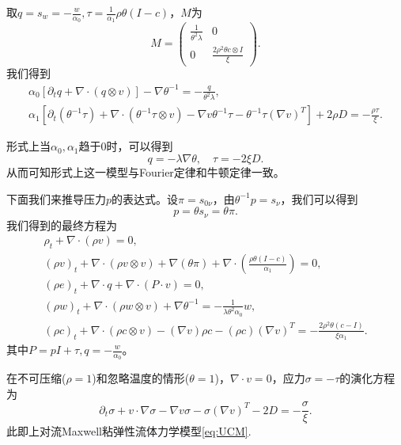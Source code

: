 	取$q=s_w=-\frac{ w}{\alpha_0},\tau = \frac{1}{\alpha_1} \rho \theta (I-c)$，$M$为
	\begin{equation*}
		M = \left( \begin{array}{ccc} 
			\frac{1}{\theta^2 \lambda} & 0 \\
			0 &  \frac{2 \rho^2 \theta c \otimes I}{\xi}   
		\end{array} \right).
	\end{equation*}
	我们得到
	\begin{eqnarray*}
		\alpha_0 [\partial_t q +  \nabla \cdot (q \otimes v)] - \nabla \theta^{-1} = -\frac{q}{\theta^2 \lambda}, \\
		\alpha_1[\partial_t (\theta^{-1} {\tau}) + \nabla \cdot (\theta^{-1} {\tau} \otimes v) - \nabla v \theta^{-1} \tau - \theta^{-1}\tau (\nabla v)^T] + 2 \rho D = -\frac{{\rho \tau}}{\xi}.
	\end{eqnarray*}
	
	形式上当$\alpha_0, \alpha_1$趋于0时，可以得到
	\begin{equation*}
		q = -\lambda \nabla \theta, \quad \tau = - 2 \xi {D} .
	\end{equation*}
	从而可知形式上这一模型与Fourier定律和牛顿定律一致。
	
	下面我们来推导压力$p$的表达式。设$\pi= s_{0\nu}$，由$\theta^{-1} p = s_\nu$，我们可以得到
	\begin{equation*}
		p = \theta s_\nu = \theta \pi . 
	\end{equation*}
	我们得到的最终方程为 
	\begin{subequations} \label{eq:genUCM}
		\begin{align}
			\rho_t + \nabla \cdot (\rho v) = 0 ,\\
			(\rho v)_t + \nabla \cdot (\rho v \otimes v) + \nabla (\theta \pi)  + \nabla \cdot ( \frac{\rho \theta(I-c)}{\alpha_1}) =0 ,\\
			(\rho e)_t + \nabla \cdot q + \nabla \cdot (P \cdot v) = 0, \\
			(\rho w)_t + \nabla \cdot (\rho w \otimes v) + \nabla \theta^{-1} = -\frac{1}{\lambda \theta^2 \alpha_0} w, \\
			(\rho c)_t +  \nabla \cdot (\rho c \otimes v) - (\nabla v) \rho c - (\rho c) (\nabla v)^T  = -\frac{2 \rho^2 \theta (c-I) }{\xi \alpha_1}.
		\end{align}
	\end{subequations}
	其中$P = pI + \tau,q =-\frac{w}{\alpha_0}$。

	在不可压缩($\rho=1$)和忽略温度的情形($\theta=1$)，$\nabla \cdot v = 0$，应力$\sigma = -\tau$的演化方程为
	\begin{equation*}
		\partial_t \sigma + v \cdot \nabla \sigma - \nabla v \sigma - \sigma (\nabla v)^T - 2 D = -\frac{\sigma}{\xi}. 
	\end{equation*}
	此即上对流Maxwell粘弹性流体力学模型\eqref{eq:UCM}.	

